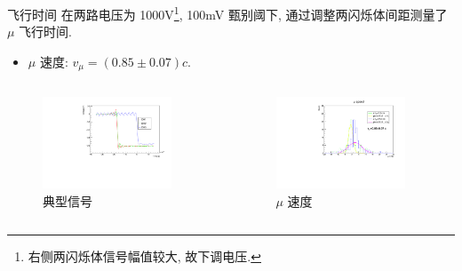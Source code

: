 \documentclass[10pt]{beamer}
\begin{document}
\begin{frame}[label={sec:orgdb3464a}]{飞行时间}
在两路电压为 1000V\footnote{右侧两闪烁体信号幅值较大, 故下调电压.}, 100mV 甄别阈下, 通过调整两闪烁体间距测量了 \(\mu\) 飞行时间.

\begin{itemize}
\item \(\mu\) 速度: \(v_{\mu} = (0.85 \pm 0.07) c\).
\end{itemize}

\begin{columns}
\begin{column}{0.5\columnwidth}
\begin{figure}[htbp]
\centering
\includegraphics[width=0.9\textwidth]{../../ExperimentData/muspeed/muspeed/muspeed0.pdf}
\caption{典型信号}
\end{figure}
\end{column}

\begin{column}{0.5\columnwidth}
\begin{figure}[htbp]
\centering
\includegraphics[width=0.9\textwidth]{../../mu/muspeed/muspeed.pdf}
\caption{\(\mu\) 速度}
\end{figure}
\end{column}
\end{columns}
\end{frame}
\end{document}
